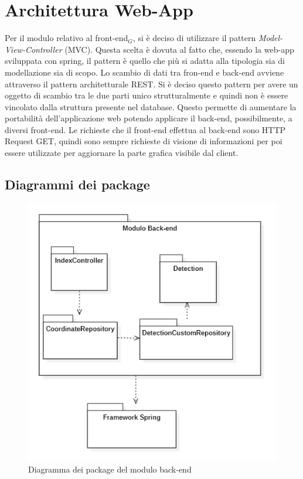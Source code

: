 \section{Architettura Web-App}\label{ArchitetturaDelProdottoWebApp}
Per il modulo relativo al front-end$_G$, si è deciso di utilizzare il pattern \textit{Model-View-Controller} (MVC).
Questa scelta è dovuta al fatto che, essendo la web-app sviluppata con spring, il pattern è quello che più si adatta alla tipologia sia di modellazione sia di scopo.
Lo scambio di dati tra fron-end e back-end avviene attraverso il pattern architetturale REST. Si è deciso questo pattern per avere un oggetto di scambio tra le due parti unico strutturalmente e quindi non è essere vincolato dalla struttura presente nel database.
Questo permette di aumentare la portabilità dell'applicazione web potendo applicare il back-end, possibilmente, a diversi front-end. Le richieste che il front-end effettua al back-end sono HTTP Request GET, quindi sono sempre richieste di visione di informazioni per poi essere utilizzate per aggiornare la parte grafica visibile dal client.
\subsection{Diagrammi dei package}
\begin{center}
	\begin{figure}[H]
		\centering\includegraphics[scale=0.8]{../immagini/diag_PB/diag_pack_spring.png}
		\caption{Diagramma dei package del modulo back-end}
	\end{figure}
\end{center}

